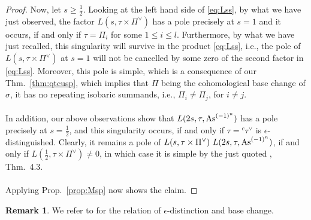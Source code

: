 \documentclass[a4paper,10pt]{amsart}
\theoremstyle{definition}
\newtheorem{rem}[equation]{Remark}
\numberwithin{equation}{section}
\begin{document}
\begin{proof}
Now, let $s\geq \tfrac12$. Looking at the left hand side of \eqref{eq:Lss}, by what we have just observed, the factor $L(s,\tau\times \Pi^\vee)$ has a pole precisely at $s=1$ and it occurs, if and only if $\tau=\Pi_i$ for some $1\leq i\leq l$. Furthermore, by what we have just recalled, this singularity will survive in the product \eqref{eq:Lss}, i.e., the pole of $L(s,\tau\times \Pi^\vee)$ at $s=1$ will not be cancelled by some zero of the second factor in \eqref{eq:Lss}. Moreover, this pole is simple, which is a consequence of our Thm.\ \ref{thm:qtcusp}, which implies that $\Pi$ being the cohomological base change of $\sigma$, it has no repeating isobaric summands, i.e., $\Pi_i\neq\Pi_j$, for $i\neq j$.\\\\ In addition, our above observations show that $L(2s, \tau, {\rm As}^{(-1)^n})$ has a pole precisely at $s=\tfrac12$, and this singularity occurs, if and only if $\tau={}^c\tau^\vee$ is $\epsilon$-distinguished. Clearly, it remains a pole of $L(s,\tau\times \Pi^\vee) \ L(2s, \tau, {\rm As}^{(-1)^n})$, if and only if $L(\tfrac12,\tau\times \Pi^\vee)\neq 0$, in which case it is simple by the just quoted \cite{grbacshahidi}, Thm.\ 4.3.\\\\ Applying Prop.\ \ref{prop:Msp} now shows the claim. 
\end{proof}

\begin{rem}
We refer to \cite{ckpssh, mok, zou} for the relation of $\epsilon$-distinction and base change. 
\end{rem}
\end{document}
